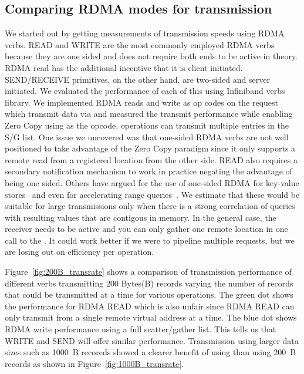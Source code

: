 \subsection{Comparing RDMA modes for transmission}
We started out by getting measurements of transmission speeds using RDMA verbs.  
READ and WRITE are the most commonly employed RDMA verbs because they are one sided
and does not require both ends to be active in theory. RDMA read has the additional incentive 
that it is client initiated. SEND/RECEIVE primitives, on the other hand, are two-sided and 
server initiated.  We evaluated the performance of each of this using Infiniband verbs library. We implemented 
RDMA reads and write as op codes on the  request which 
transmit data via  and measured the transmit 
performance while enabling Zero Copy using  as the opcode.
 operations can transmit multiple entries in the S/G list.
One issue we uncovered was that one-sided RDMA verbs are not well positioned to 
take advantage of the Zero Copy paradigm since it only supports a remote read 
from a registered location from the other side. READ also requires a secondary notification mechanism 
to work in practice negating the advantage of being one sided.
Others have argued for the use of one-sided RDMA for key-value stores~\cite{pilaf} and even for accelerating 
range queries~\cite{zerocopyrangequery}. We estimate that these would be suitable for large transmissions only when there is a strong 
correlation of queries with resulting values that are contigous in memory. In the general case, the receiver 
needs to be active and you can only gather one remote location in one call to the .
It could work better if we were to pipeline multiple requests, but we are losing out on efficiency per operation.

Figure~\ref{fig:200B_transrate} shows a comparison of transmission
performance of different verbs transmitting 200 Bytes(B) records varying the number of records
that could be transmitted at a time for various operations. The green dot shows
the performance for RDMA READ which is also unfair since RDMA READ can only transmit from a single remote virtual address at a time.
The blue dot shows RDMA write performance using a full scatter/gather list. This tells us that WRITE and SEND will offer 
similar performance. Transmission using larger data sizes such as 1000~B recoreds showed a clearer benefit of using  than 
using 200~B records as shown in Figure~\ref{fig:1000B_transrate}.



